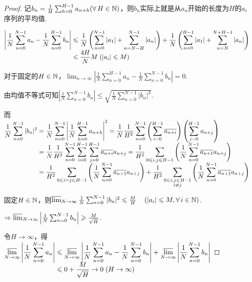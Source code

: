\begin{proof}
    记$b_n=\frac{1}{H}\sum_{h=0}^{H-1}{a_{n+h}}(\forall\, H\in\mb{N})$，则$b_n$实际上就是从$a_n$开始的长度为$H$的$a_i$序列的平均值.\par
    $\setjot[-2]\begin{aligned}[t]
        \left|\frac{1}{N}\sum_{n=0}^{N-1}a_n-\frac{1}{N}\sum_{n=0}^{H-1}b_n\right|&\leq \frac{1}{N}\left(\sum_{n=0}^{N-1}|a_1|+\sum_{n=N-H}^{N-1}|a_n|\right)+\frac{1}{N}\left(\sum_{n=0}^{H-1}|a_1|+\sum_{n=N}^{N+H-1}|a_n|\right) \\
        &\leq \frac{4H}{N}M\;(|a_i|\leq M)
    \end{aligned}$\par
    对于固定的$H\in\mb{N}$，$\lim_{n\to\infty}\left|\frac{1}{N}\sum_{n=0}^{H-1}a_n-\frac{1}{N}\sum_{n=0}^{N-1}{b_n}\right|=0$.\par
    由均值不等式可知$\left|\frac{1}{N}\sum_{n=0}^{N-1}b_n\right|\leq \sqrt{\frac{1}{N}\sum_{n=0}^{N-1}|b_n|^2}$.\par
    而$\setjot[-2]\begin{aligned}[t]
        \frac{1}{N}\sum_{n=0}^{N-1}|b_n|^2 &=\frac{1}{N}\sum_{n=0}^{N-1}\left|\frac{1}{N}\sum_{h=0}^{H-1}a_{n+h}\right|^2=\frac{1}{N}\frac{1}{H^2}\sum_{n=0}^{N-1}\left(\sum_{i=0}^{H-1}\overline{a_{n+i}}\right)\left(\sum_{j=0}^{H-1}{a_{n+j}}\right) \\
        &=\frac{1}{N}\frac{1}{H^2}\sum_{n=0}^{N-1}\sum_{i=0}^{H-1}\sum_{j=0}^{H-1}\overline{a_{n+i}}a_{n+j}=\frac{1}{H^2}\sum_{0\leq i,j\leq H-1}\left(\frac{1}{N}\sum_{n=0}^{N-1}{\overline{a_{n+1}}a_{n+j}}\right) \\
        &=\frac{1}{H^2}\sum_{0\leq i=j\leq H-1}\left(\frac{1}{N}\sum_{n=0}^{N-1}{\overline{a_{n+1}}a_{n+j}}\right)+\frac{1}{H^2}\sum_{\substack{0\leq i,j\leq H-1\\ i\neq j}}\left(\frac{1}{N}\sum_{n=0}^{N-1}{\overline{a_{n+1}}a_{n+j}}\right)
    \end{aligned}$\par
    固定$H\in\mb{N}$，则$\varlimsup_{N\to\infty}{\frac{1}{N}\sum_{n=0}^{N-1}{|b_n|^2}}\leq\frac{M}{H}\quad \left(|a_i|\leq M,\forall\, i\in\mb{N}\right)$.\par
    $\Rightarrow \varlimsup_{N\to\infty}\left|\frac{1}{N}\sum_{n=0}^{N-1}{b_n}\right|\geq\frac{M}{\sqrt{H}}$.\par
    令$H\to\infty$，得$\setjot[-2]\begin{aligned}[t]
        \varlimsup_{N\to\infty}\left|\frac{1}{N}\sum_{n=0}^{N-1}a_n\right|&\leq\varlimsup_{N\to\infty}\left|\frac{1}{N}\sum_{n=0}^{N-1}{a_n}-\frac{1}{N}\sum_{n=0}^{N-1}b_n\right|+\varlimsup_{N\to\infty}\left|\frac{1}{N}\sum_{n=0}^{N-1}b_n\right| \\
        &\leq 0+\frac{M}{\sqrt{H}} \to 0\;(H\to\infty)
    \end{aligned}$\par
\end{proof}

